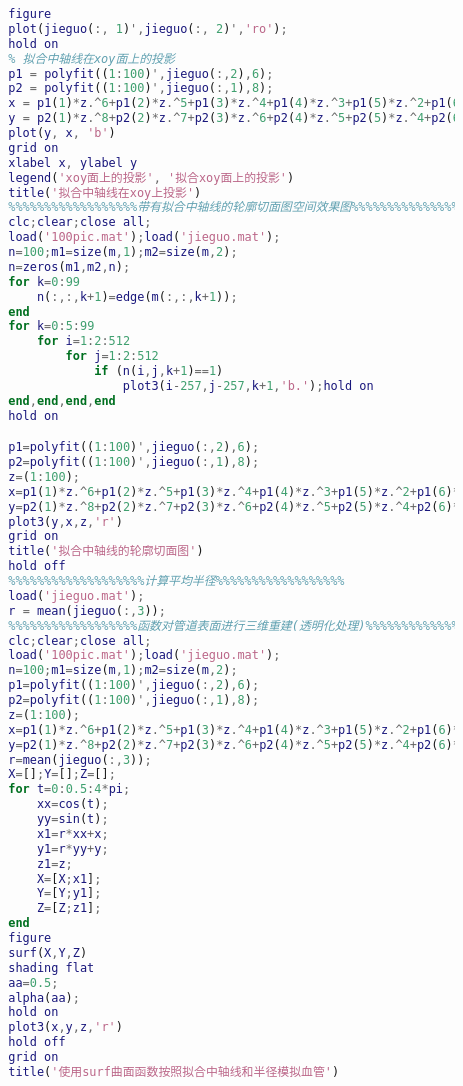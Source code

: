 \begin{lstlisting}[language = Matlab]
        % 4.中轴线在xoy面上的投影
        figure
        plot(jieguo(:, 1)',jieguo(:, 2)','ro');
        hold on
        % 拟合中轴线在xoy面上的投影
        p1 = polyfit((1:100)',jieguo(:,2),6);
        p2 = polyfit((1:100)',jieguo(:,1),8);
        x = p1(1)*z.^6+p1(2)*z.^5+p1(3)*z.^4+p1(4)*z.^3+p1(5)*z.^2+p1(6)*z+p1(7);
        y = p2(1)*z.^8+p2(2)*z.^7+p2(3)*z.^6+p2(4)*z.^5+p2(5)*z.^4+p2(6)*z.^3+p2(7)*z.^2+p2(8)*z+p2(9);
        plot(y, x, 'b')
        grid on
        xlabel x, ylabel y
        legend('xoy面上的投影', '拟合xoy面上的投影')
        title('拟合中轴线在xoy上投影')
        %%%%%%%%%%%%%%%%%%带有拟合中轴线的轮廓切面图空间效果图%%%%%%%%%%%%%%%%%%
        clc;clear;close all;
        load('100pic.mat');load('jieguo.mat');
        n=100;m1=size(m,1);m2=size(m,2);
        n=zeros(m1,m2,n);
        for k=0:99
            n(:,:,k+1)=edge(m(:,:,k+1));
        end
        for k=0:5:99
            for i=1:2:512
                for j=1:2:512
                    if (n(i,j,k+1)==1)
                        plot3(i-257,j-257,k+1,'b.');hold on
        end,end,end,end
        hold on

        p1=polyfit((1:100)',jieguo(:,2),6);
        p2=polyfit((1:100)',jieguo(:,1),8);
        z=(1:100);
        x=p1(1)*z.^6+p1(2)*z.^5+p1(3)*z.^4+p1(4)*z.^3+p1(5)*z.^2+p1(6)*z+p1(7);
        y=p2(1)*z.^8+p2(2)*z.^7+p2(3)*z.^6+p2(4)*z.^5+p2(5)*z.^4+p2(6)*z.^3+p2(7)*z.^2+p2(8)*z+p2(9);
        plot3(y,x,z,'r')
        grid on
        title('拟合中轴线的轮廓切面图')
        hold off
        %%%%%%%%%%%%%%%%%%%计算平均半径%%%%%%%%%%%%%%%%%%
        load('jieguo.mat');
        r = mean(jieguo(:,3));
        %%%%%%%%%%%%%%%%%%函数对管道表面进行三维重建(透明化处理)%%%%%%%%%%%%%%%%%%
        clc;clear;close all;
        load('100pic.mat');load('jieguo.mat');
        n=100;m1=size(m,1);m2=size(m,2);
        p1=polyfit((1:100)',jieguo(:,2),6);
        p2=polyfit((1:100)',jieguo(:,1),8);
        z=(1:100);
        x=p1(1)*z.^6+p1(2)*z.^5+p1(3)*z.^4+p1(4)*z.^3+p1(5)*z.^2+p1(6)*z+p1(7);
        y=p2(1)*z.^8+p2(2)*z.^7+p2(3)*z.^6+p2(4)*z.^5+p2(5)*z.^4+p2(6)*z.^3+p2(7)*z.^2+p2(8)*z+p2(9);
        r=mean(jieguo(:,3));
        X=[];Y=[];Z=[];
        for t=0:0.5:4*pi;
            xx=cos(t);
            yy=sin(t);
            x1=r*xx+x;
            y1=r*yy+y;
            z1=z;
            X=[X;x1];
            Y=[Y;y1];
            Z=[Z;z1];
        end
        figure
        surf(X,Y,Z)
        shading flat
        aa=0.5;
        alpha(aa);
        hold on
        plot3(x,y,z,'r')
        hold off
        grid on
        title('使用surf曲面函数按照拟合中轴线和半径模拟血管')
        \end{lstlisting}
